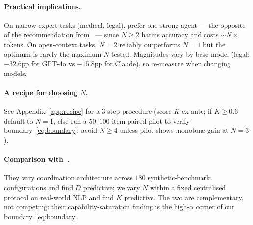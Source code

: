 \documentclass{article}
\begin{document}
\paragraph{Practical implications.} On narrow-expert tasks (medical, legal), prefer one strong agent --- the opposite of the recommendation from~\citet{li2024moreagents} --- since $N{\geq}2$ harms accuracy and costs ${\sim}N{\times}$ tokens. On open-context tasks, $N{=}2$ reliably outperforms $N{=}1$ but the optimum is rarely the maximum $N$ tested. Magnitudes vary by base model (legal: $-32.6$pp for GPT-4o vs $-15.8$pp for Claude), so re-measure when changing models.

\paragraph{A recipe for choosing $N$.} See Appendix~\ref{app:recipe} for a $3$-step procedure (score $K$ ex ante; if $K \geq 0.6$ default to $N{=}1$, else run a $50$--$100$-item paired pilot to verify boundary~\eqref{eq:boundary}; avoid $N{\geq}4$ unless pilot shows monotone gain at $N{=}3$).

\paragraph{Comparison with~\citet{google2025scalingagents}.} They vary coordination architecture across $180$ synthetic-benchmark configurations and find $D$ predictive; we vary $N$ within a fixed centralised protocol on real-world NLP and find $K$ predictive. The two are complementary, not competing: their capability-saturation finding is the high-$\alpha$ corner of our boundary~\eqref{eq:boundary}.
\end{document}
